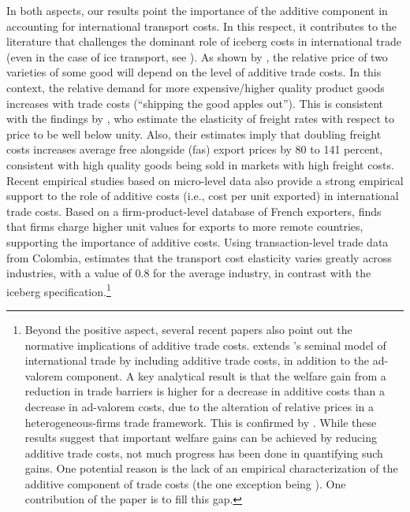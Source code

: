 \documentclass[a4paper,11pt]{article}
\begin{document}
In both aspects, our results point the importance of the additive component in accounting for international transport costs.
In this respect, it contributes to the literature that challenges the dominant role of iceberg costs in international trade (even in the case of ice transport, see \citealp{bosker2018ice}).
As shown by \cite{alchian}, the relative price of two varieties of some good will depend on the level of additive trade costs.
In this context, the relative demand for more expensive/higher quality product goods increases with trade costs (``shipping the good apples out'').
This is consistent with the findings by \citet{hummels_skiba}, who estimate the elasticity of freight rates with respect to price to be well below unity.
Also, their estimates imply that doubling freight costs increases average free alongside (fas) export prices by 80 to 141 percent, consistent with high quality goods being sold in markets with high freight costs.
Recent empirical studies based on micro-level data also provide a strong empirical support to the role of additive costs (i.e., cost per unit exported) in international trade costs.
Based on a firm-product-level database of French exporters, \citet{martin2012} finds that firms charge higher unit values for exports to more remote countries, supporting the importance of additive costs.
Using transaction-level trade data from Colombia, \cite{Lashkaripour-2017b} estimates that the transport cost elasticity varies greatly across industries, with a value of 0.8 for the average industry, in contrast with the iceberg specification.\footnote{Beyond the positive aspect, several recent papers also point out the normative implications of additive trade costs.
\citet{sorensen2014} extends \citet{melitz}'s seminal model of international trade by including additive trade costs, in addition to the ad-valorem component.
A key analytical result is that the welfare gain from a reduction in trade barriers is higher for a decrease in additive costs than a decrease in ad-valorem costs, due to the alteration of relative prices in a heterogeneous-firms trade framework.
This is confirmed by \cite{Irrazabal_2015}.
While these results suggest that important welfare gains can be achieved by reducing additive trade costs, not much progress has been done in quantifying such gains.
One potential reason is the lack of an empirical characterization of the additive component of trade costs (the one exception being \citealp{Irrazabal_2015}).
One contribution of the paper is to fill this gap.}
\end{document}
